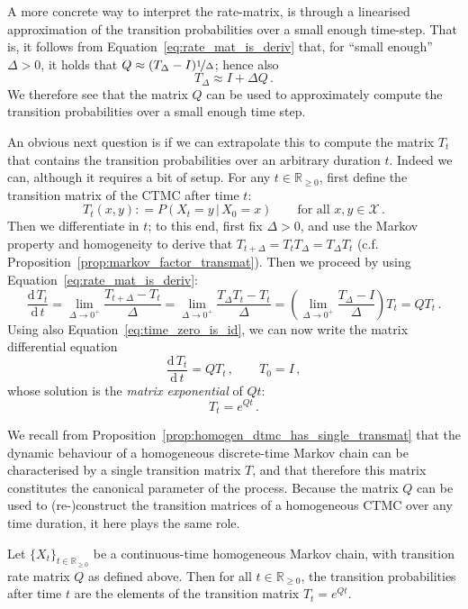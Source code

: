 \documentclass[graybox]{svmult}
\newcommand{\reals}{\mathbb{R}}
\newcommand{\realsnonneg}{\reals_{\geq 0}}
\newcommand{\states}{\mathcal{X}}
\newcommand{\coloneqq}{:\!=}
\begin{document}
A more concrete way to interpret the rate-matrix, is through a linearised approximation of the transition probabilities over a small enough time-step. That is, it follows from Equation~\eqref{eq:rate_mat_is_deriv} that, for ``small enough'' $\Delta>0$, it holds that $Q\approx (T_\Delta-I)\nicefrac{1}{\Delta}$; hence also
\begin{equation}\label{eq:cont_trans_small_delta}
T_\Delta \approx I + \Delta Q\,.
\end{equation}
We therefore see that the matrix $Q$ can be used to approximately compute the transition probabilities over a small enough time step.

An obvious next question is if we can extrapolate this to compute the matrix $T_t$ that contains the transition probabilities over an arbitrary duration $t$. Indeed we can, although it requires a bit of setup. For any $t\in\realsnonneg$, first define the transition matrix of the CTMC after time $t$:
\begin{equation*}
T_t(x,y) \coloneqq P(X_{t}=y\,\vert\,X_0=x)\quad\quad\text{for all }x,y\in\states\,.
\end{equation*}
Then we differentiate in $t$; to this end, first fix $\Delta>0$, and use the Markov property and homogeneity to derive that $T_{t+\Delta} = T_tT_\Delta=T_\Delta T_t$ (c.f. Proposition~\ref{prop:markov_factor_transmat}). Then we proceed by using Equation~\eqref{eq:rate_mat_is_deriv}:
\begin{equation*}
\frac{\mathrm{d}\,T_t}{\mathrm{d}\,t} = \lim_{\Delta\to0^+} \frac{T_{t+\Delta} - T_t}{\Delta} = \lim_{\Delta\to0^+} \frac{T_\Delta T_t - T_t}{\Delta} = \left(\lim_{\Delta\to0^+} \frac{T_\Delta - I}{\Delta}\right)T_t = QT_t\,.
\end{equation*}
Using also Equation~\eqref{eq:time_zero_is_id}, we can now write the matrix differential equation
\begin{equation*}
\frac{\mathrm{d}\,T_t}{\mathrm{d}\,t} = QT_t\,,\quad\quad T_0 = I\,,
\end{equation*}
whose solution is the \emph{matrix exponential} of $Qt$:
\begin{equation*}
T_t = e^{Qt}\,.
\end{equation*}

We recall from Proposition~\ref{prop:homogen_dtmc_has_single_transmat} that the dynamic behaviour of a homogeneous discrete-time Markov chain can be characterised by a single transition matrix $T$, and that therefore this matrix constitutes the canonical parameter of the process. Because the matrix $Q$ can be used to (re-)construct the transition matrices of a homogeneous CTMC over any time duration, it here plays the same role.
\begin{proposition}\label{prop:ctmc_homogen_transmat_is_exponential}
Let $\{X_t\}_{t\in\realsnonneg}$ be a continuous-time homogeneous Markov chain, with transition rate matrix $Q$ as defined above. Then for all $t\in\realsnonneg$, the transition probabilities after time $t$ are the elements of the transition matrix $T_t=e^{Qt}$.
\end{proposition}
\end{document}
